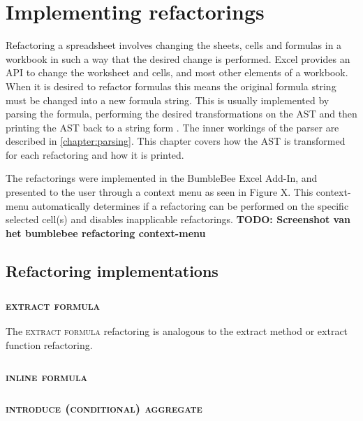 \documentclass[12pt,a4paper,onecolumn,oneside,parskip]{memoir}
\newcommand{\todo}[1]{\textbf{TODO: #1}}
\newcommand{\rf}[1]{\textsc{\lowercase{#1}}}
\begin{document}
\chapter{Implementing refactorings}
\label{chapter:implementingrefactorings}

Refactoring a spreadsheet involves changing the sheets, cells and formulas in a workbook in such a way that the desired change is performed.
Excel provides an API to change the worksheet and cells, and most other elements of a workbook.
When it is desired to refactor formulas this means the original formula string must be changed into a new formula string.
This is usually implemented by parsing the formula, performing the desired transformations on the AST and then printing the AST back to a string form \cite{fowler1999refactoring}.
The inner workings of the parser are described in \ref{chapter:parsing}.
This chapter covers how the AST is transformed for each refactoring and how it is printed.

The refactorings were implemented in the BumbleBee Excel Add-In, and presented to the user through a context menu as seen in Figure X.
This context-menu automatically determines if a refactoring can be performed on the specific selected cell(s) and disables inapplicable refactorings.
\todo{Screenshot van het bumblebee refactoring context-menu}

\section{Refactoring implementations}

\noindent
\begin{figure}[h!]
\hspace*{0.003\textwidth}

\end{figure}

\FloatBarrier

\subsection{\rf{Extract formula}}

The \rf{extract formula} refactoring is analogous to the extract method or extract function refactoring.

\subsection{\rf{Inline formula}}

\subsection{\rf{Introduce (Conditional) Aggregate}}
\end{document}
